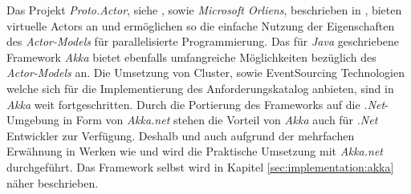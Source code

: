Das Projekt \textit{Proto.Actor}, siehe \cite{Proto.Actor}, sowie \textit{Microsoft Orliens}, beschrieben in \cite{bykov2011orleans}, bieten virtuelle  Actors an und ermöglichen so die einfache Nutzung der Eigenschaften des \textit{Actor-Models} für parallelisierte Programmierung. Das für \textit{Java} geschriebene Framework \textit{Akka} bietet ebenfalls umfangreiche Möglichkeiten bezüglich des \textit{Actor-Models} an. Die Umsetzung von Cluster, sowie EventSourcing Technologien welche sich für die Implementierung des Anforderungskatalog anbieten, sind in \textit{Akka} weit fortgeschritten. Durch die Portierung des Frameworks auf die \textit{.Net}-Umgebung in Form von \textit{Akka.net} stehen die Vorteil von \textit{Akka} auch für \textit{.Net} Entwickler zur Verfügung.
Deshalb und auch aufgrund der mehrfachen Erwähnung in Werken wie \cite{Vernon2015ReactiveAkka} und \cite{bernhardt2016reactive} wird die Praktische Umsetzung mit \textit{Akka.net} durchgeführt.
  Das Framework selbst wird in Kapitel \ref{sec:implementation:akka} näher beschrieben. 